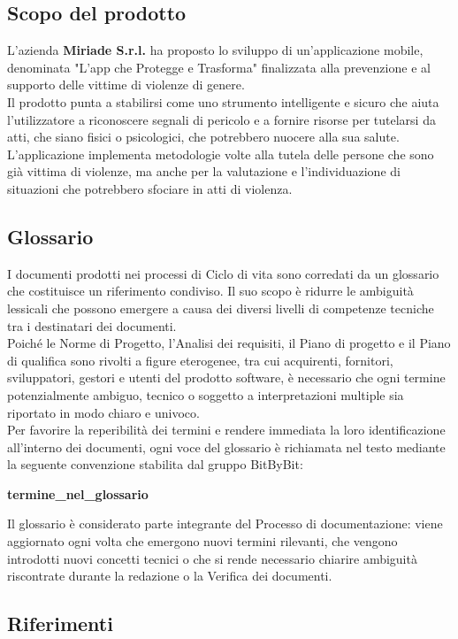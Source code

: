 \documentclass[a4paper,12pt]{article}
\begin{document}
\subsection{Scopo del prodotto}
L'azienda \textbf{Miriade S.r.l.} ha proposto lo sviluppo di un'applicazione mobile, denominata "L'app che Protegge e Trasforma" finalizzata alla prevenzione e al supporto delle vittime di violenze di genere. \\Il prodotto punta a stabilirsi come uno strumento intelligente e sicuro che aiuta l'utilizzatore a riconoscere segnali di pericolo e a fornire risorse per tutelarsi da atti, che siano fisici o psicologici, che potrebbero nuocere alla sua salute. L'applicazione implementa metodologie volte alla tutela delle persone che sono già vittima di violenze, ma anche per la valutazione e l'individuazione di situazioni che potrebbero sfociare in atti di violenza.

\subsection{Glossario}
I documenti prodotti nei processi di Ciclo di vita sono corredati da un glossario che costituisce un riferimento condiviso. Il suo scopo è ridurre le ambiguità lessicali che possono emergere a causa dei diversi livelli di competenze tecniche tra i destinatari dei documenti. \\Poiché le Norme di Progetto, l’Analisi dei requisiti, il Piano di progetto e il Piano di qualifica sono rivolti a figure eterogenee, tra cui acquirenti, fornitori, sviluppatori, gestori e utenti del prodotto software, è necessario che ogni termine potenzialmente ambiguo, tecnico o soggetto a interpretazioni multiple sia riportato in modo chiaro e univoco.\\Per favorire la reperibilità dei termini e rendere immediata la loro identificazione all’interno dei documenti, ogni voce del glossario è richiamata nel testo mediante la seguente convenzione stabilita dal gruppo BitByBit: 
\begin{center}
    \textbf{termine\_nel\_glossario}
\end{center}
Il glossario è considerato parte integrante del Processo di documentazione: viene aggiornato ogni volta che emergono nuovi termini rilevanti, che vengono introdotti nuovi concetti tecnici o che si rende necessario chiarire ambiguità riscontrate durante la redazione o la Verifica dei documenti.

\subsection{Riferimenti}
\end{document}
